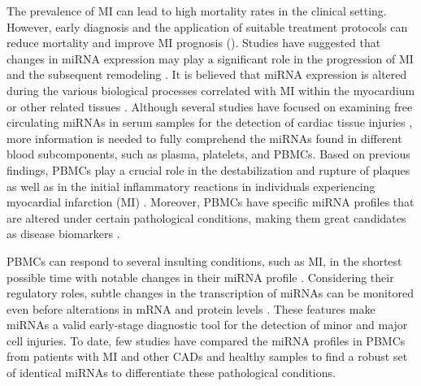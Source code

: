 \documentclass[sn-mathphys,Numbered]{sn-jnl}%
\theoremstyle{thmstyleone}%
\theoremstyle{thmstyletwo}%
\theoremstyle{thmstylethree}%
\begin{document}
The prevalence of MI can lead to high mortality rates in the clinical
setting. However, early diagnosis and the application of suitable
treatment protocols can reduce mortality and improve MI prognosis
(\cite{CVD, 17, 18}). Studies have suggested that changes in miRNA expression
may play a significant role in the progression of MI and the subsequent
remodeling \cite{23}. It is believed that miRNA
expression is altered during the various biological processes correlated
with MI within the myocardium or other related tissues \cite{24}. Although several studies have focused on examining free
circulating miRNAs in serum samples for the detection of cardiac tissue
injuries \cite{11-15}, more information is needed to fully
comprehend the miRNAs found in different blood subcomponents, such as
plasma, platelets, and PBMCs. Based on previous findings, PBMCs play a
crucial role in the destabilization and rupture of plaques as well as in
the initial inflammatory reactions in individuals experiencing
myocardial infarction (MI) \cite{Meder6, Meder23}.
Moreover, PBMCs have specific miRNA profiles that are altered under
certain pathological conditions, making them great candidates as disease
biomarkers \cite{Meder6}.

PBMCs can respond to several insulting conditions, such as MI, in the
shortest possible time with notable changes in their miRNA profile
\cite{Meder6}. Considering their regulatory roles, subtle
changes in the transcription of miRNAs can be monitored even before
alterations in mRNA and protein levels \cite{miR}. These
features make miRNAs a valid early-stage diagnostic tool for the
detection of minor and major cell injuries. To date, few studies have
compared the miRNA profiles in PBMCs from patients with MI and other
CADs and healthy samples to find a robust set of identical miRNAs to
differentiate these pathological conditions.
\end{document}
